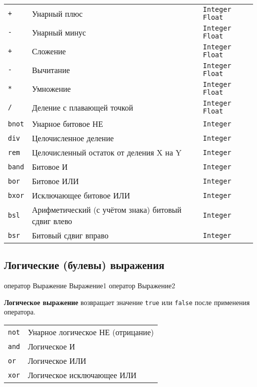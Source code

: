 \begin{center}
\begin{tabular}{|>{\raggedright}p{35pt}|>{\raggedright}p{185pt}|>{\raggedright}p{128pt}|}
\hline
\multicolumn{3}{|p{309pt}|}{Арифметические операторы}\tabularnewline
\hline
\texttt{+}  & Унарный плюс  &
\texttt{Integer} \textbar{} \texttt{Float} \tabularnewline
\hline
\texttt{-}  & Унарный минус  &
\texttt{Integer} \textbar{} \texttt{Float} \tabularnewline
\hline
\texttt{+}  & Сложение &
\texttt{Integer} \textbar{} \texttt{Float}\tabularnewline
\hline
\texttt{-}  & Вычитание &
\texttt{Integer} \textbar{} \texttt{Float}\tabularnewline
\hline
\texttt{*}  & Умножение &
\texttt{Integer} \textbar{} \texttt{Float}\tabularnewline
\hline
\texttt{/}  & Деление с плавающей точкой &
\texttt{Integer} \textbar{} \texttt{Float}\tabularnewline
\hline
\texttt{bnot}  & Унарное битовое НЕ &
\texttt{Integer} \tabularnewline
\hline
\texttt{div}  & Целочисленное деление &
\texttt{Integer}\tabularnewline
\hline
\texttt{rem}  & Целочисленный остаток от деления X на Y  &
\texttt{Integer} \tabularnewline
\hline
\texttt{band}  & Битовое И & \texttt{Integer}\tabularnewline
\hline
\texttt{bor}  & Битовое ИЛИ & \texttt{Integer} \tabularnewline
\hline
\texttt{bxor}  & Исключающее битовое ИЛИ &
\texttt{Integer}\tabularnewline
\hline
\texttt{bsl}  & Арифметический (с учётом знака) битовый сдвиг влево &
\texttt{Integer} \tabularnewline
\hline
\texttt{bsr}  & Битовый сдвиг вправо &
\texttt{Integer}\tabularnewline
\hline
\end{tabular}
\end{center}



\subsection{Логические (булевы) выражения}

\begin{erlangru}
оператор Выражение
Выражение1 оператор Выражение2
\end{erlangru}

\textbf{Логическое выражение} возвращает значение \texttt{true} или 
\texttt{false} после применения оператора.

\begin{center}
\begin{tabular}{|>{\raggedright}p{79pt}|>{\raggedright}p{241pt}|}
\hline
\multicolumn{2}{|p{321pt}|}{Логические (булевы) операторы}\tabularnewline
\hline
\texttt{not}  & Унарное логическое НЕ (отрицание) \tabularnewline
\hline
\texttt{and}  & Логическое И \tabularnewline
\hline
\texttt{or}  & Логическое ИЛИ \tabularnewline
\hline
\texttt{xor}  & Логическое исключающее ИЛИ \tabularnewline
\hline
\end{tabular}
\end{center}


